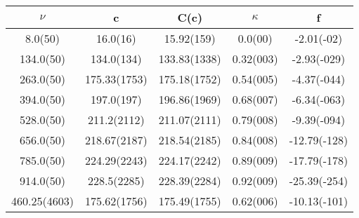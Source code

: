 \begin{table}[H]
	\centering
	\begin{tabular}{ccccc}
		$\nu$ & c & C(c) & $\kappa$ & f\\
		\hline
		8.0(50) & 16.0(16) & 15.92(159) & 0.0(00) & -2.01(-02)	\\
		134.0(50) & 134.0(134) & 133.83(1338) & 0.32(003) & -2.93(-029)	\\
		263.0(50) & 175.33(1753) & 175.18(1752) & 0.54(005) & -4.37(-044)	\\
		394.0(50) & 197.0(197) & 196.86(1969) & 0.68(007) & -6.34(-063)	\\
		528.0(50) & 211.2(2112) & 211.07(2111) & 0.79(008) & -9.39(-094)	\\
		656.0(50) & 218.67(2187) & 218.54(2185) & 0.84(008) & -12.79(-128)	\\
		785.0(50) & 224.29(2243) & 224.17(2242) & 0.89(009) & -17.79(-178)	\\
		914.0(50) & 228.5(2285) & 228.39(2284) & 0.92(009) & -25.39(-254)	\\
		460.25(4603) & 175.62(1756) & 175.49(1755) & 0.62(006) & -10.13(-101)	\\
	\end{tabular}
\end{table}